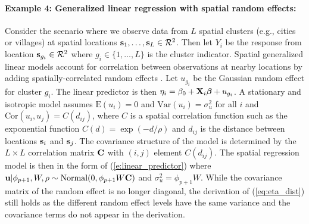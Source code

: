 \documentclass[12pt]{article}
\begin{document}
\begin{comment}
The linear predictor for this example is the same as that of Example 1 except now the responses follow $Y_i|\eta_i\sim\mbox{Bernoulli}\{\mbox{logistic}(\eta_i)\}$ where $\mbox{logistic}(x)=(1+e^{-x})^{-1}$. Again, there are no random effects in this model so we take $\beta_j\sim\mbox{Normal}(0,\phi_j W)$ for $j=1,\dots,p$.
\end{comment}


\paragraph{Example 4: Generalized linear regression with spatial random effects:} Consider the scenario where we observe data from $L$ spatial clusters (e.g., cities or villages) at spatial locations $\mbox{\bf s}_1,\dots,\mbox{\bf s}_L\in{\cal R}^2$. Then let $Y_i$ be the response from location $\mbox{\bf s}_{g_i}\in{\cal R}^2$ where $g_i\in\{1,\dots,L\}$ is the cluster indicator. Spatial generalized linear models account for correlation between observations at nearby locations by adding spatially-correlated random effects \citep[e.g.,][]{diggle1998model}. Let $u_{g_i}$ be the Gaussian random effect for cluster $g_i$.  The linear predictor is then $\eta_i = \beta_0 + \mbox{\bf X}_i\mbox{\boldmath $\beta$} + u_{g_i}$.  A stationary and isotropic model assumes $\mbox{E}(u_i)=0$ and $\mbox{Var}(u_i)=\sigma_u^2$ for all $i$ and $\mbox{Cor}(u_i,u_j)=C(d_{ij})$, where $C$ is a spatial correlation function such as the exponential function $C(d) = \exp(-d/\rho)$ and $d_{ij}$ is the distance between locations $\mbox{\bf s}_i$ and $\mbox{\bf s}_j$. The covariance structure of the model is determined by the $L\times L$ correlation matrix $\mbox{\bf C}$ with $(i,j)$ element $C(d_{ij})$.  The spatial regression model is then in the form of (\ref{e:linear_predictor}) where $\mbox{\bf u}|\phi_{p+1},W,\rho \sim\mbox{Normal}(0,\phi_{p+1}W{\bf C})$ and $\sigma^2_u=\phi_{p+1}W$. While the covariance matrix of the random effect is no longer diagonal, the derivation of (\ref{eq:eta_dist}) still holds as the different random effect levels have the same variance and the covariance terms do not appear in the derivation.



\end{document}
